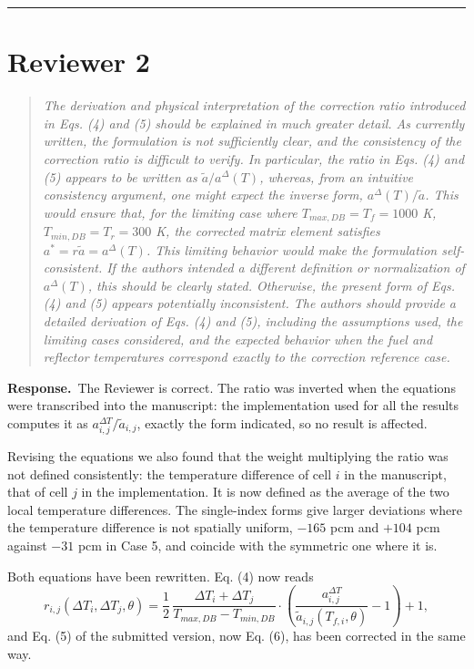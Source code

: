 \documentclass[11pt]{article}
\newenvironment{reviewer}%
  {\medskip\begin{quote}\itshape\color{black!70}}%
  {\end{quote}}
\newcommand{\answer}{\textbf{Response.}\ }
\begin{document}
\bigskip

\hrule
\bigskip

\section*{Reviewer 2}

\begin{reviewer}
The derivation and physical interpretation of the correction ratio introduced in Eqs. (4) and (5) should be explained in much greater detail. As currently written, the formulation is not sufficiently clear, and the consistency of the correction ratio is difficult to verify. In particular, the ratio in Eqs. (4) and (5) appears to be written as $\tilde{a}/a^{\Delta}(T)$, whereas, from an intuitive consistency argument, one might expect the inverse form, $a^{\Delta}(T)/\tilde{a}$. This would ensure that, for the limiting case where $T_{max,DB} = T_f = 1000$ K, $T_{min,DB} = T_r = 300$ K, the corrected matrix element satisfies $a^{*} = r \tilde{a} = a^{\Delta}(T)$. This limiting behavior would make the formulation self-consistent. If the authors intended a different definition or normalization of $a^{\Delta}(T)$, this should be clearly stated. Otherwise, the present form of Eqs. (4) and (5) appears potentially inconsistent. The authors should provide a detailed derivation of Eqs. (4) and (5), including the assumptions used, the limiting cases considered, and the expected behavior when the fuel and reflector temperatures correspond exactly to the correction reference case.
\end{reviewer}

\answer The Reviewer is correct. The ratio was inverted when the equations were transcribed into the manuscript: the implementation used for all the results computes it as $a^{\Delta T}_{i,j} / \tilde{a}_{i,j}$, exactly the form indicated, so no result is affected.

Revising the equations we also found that the weight multiplying the ratio was not defined consistently: the temperature difference of cell $i$ in the manuscript, that of cell $j$ in the implementation. It is now defined as the average of the two local temperature differences. The single-index forms give larger deviations where the temperature difference is not spatially uniform, $-165$ pcm and $+104$ pcm against $-31$ pcm in Case 5, and coincide with the symmetric one where it is.

Both equations have been rewritten. Eq. (4) now reads
%
\begin{equation*}
r_{i,j}(\Delta T_i, \Delta T_j, \theta) = \frac{1}{2}\,\frac{\Delta T_i + \Delta T_j}{T_{max,DB} - T_{min,DB}} \cdot \left( \frac{ a_{i,j}^{\Delta T}}{\tilde{a}_{i,j}(T_{f,i}, \theta)} - 1 \right) + 1 ,
\end{equation*}
%
and Eq. (5) of the submitted version, now Eq. (6), has been corrected in the same way.
\end{document}
